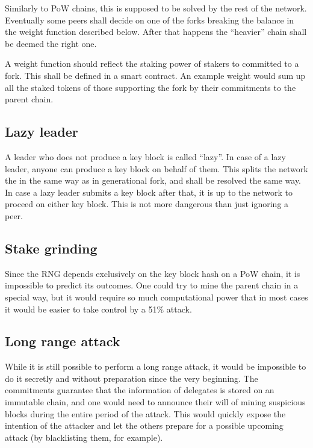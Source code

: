 Similarly to PoW chains, this is supposed to be solved by the rest of the
network. Eventually some peers shall decide on one of the forks breaking the
balance in the weight function described below. After that happens the
``heavier'' chain shall be deemed the right one.

A weight function should reflect the staking power of stakers to committed to a
fork. This shall be defined in a smart contract. An example weight would sum up
all the staked tokens of those supporting the fork by their commitments to the
parent chain.

\subsection{Lazy leader}

A leader who does not produce a key block is called ``lazy''. In case of a lazy
leader, anyone can produce a key block on behalf of them. This splits the
network the in the same way as in generational fork, and shall be resolved the
same way. In case a lazy leader submits a key block after that, it is up to the
network to proceed on either key block. This is not more dangerous than just
ignoring a peer.

\subsection{Stake grinding}

Since the RNG depends exclusively on the key block hash on a PoW chain, it is
impossible to predict its outcomes. One could try to mine the parent chain in a
special way, but it would require so much computational power that in most cases
it would be easier to take control by a 51\% attack.

\subsection{Long range attack}

While it is still possible to perform a long range attack, it would be
impossible to do it secretly and without preparation since the very beginning.
The commitments guarantee that the information of delegates is stored on an
immutable chain, and one would need to announce their will of mining suspicious
blocks during the entire period of the attack. This would quickly expose the
intention of the attacker and let the others prepare for a possible upcoming
attack (by blacklisting them, for example).

